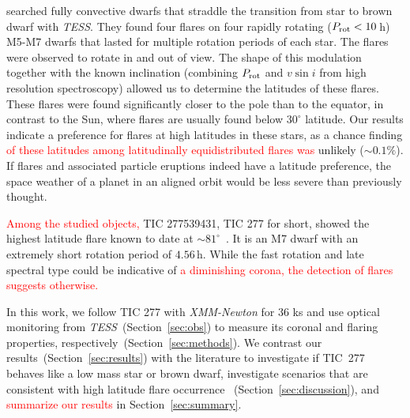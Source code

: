 \documentclass[twocolumn]{aastex631}
\begin{document}
\citet{ilin2021giant} searched fully convective dwarfs that straddle the transition from star to brown dwarf with \textit{TESS}. They found four flares on four rapidly rotating ($P_{\rm rot}<10\,$h) M5-M7 dwarfs that lasted for multiple rotation periods of each star. The flares were observed to rotate in and out of view. The shape of this modulation together with the known inclination (combining $P_{\rm rot}$ and $v \sin i$ from high resolution spectroscopy) allowed us to determine the latitudes of these flares. These flares were found significantly closer to the pole than to the equator, in contrast to the Sun, where flares are usually found below $30^{\circ}$ latitude. Our results indicate a preference for flares at high latitudes in these stars, as a chance finding \textcolor{red}{of these latitudes among latitudinally equidistributed flares was } unlikely ($\sim 0.1\%$). If flares and associated particle eruptions indeed have a latitude preference, the space weather of a planet in an aligned orbit would be less severe than previously thought. %


\textcolor{red}{Among the studied objects, }TIC 277539431, TIC 277 for short, showed the highest latitude flare known to date at $\sim81^{\circ}$~\citep[][Table \ref{tab:starparams}]{ilin2021giant}. It is an M7 dwarf with an extremely short rotation period of $4.56\,$h. While the fast rotation and late spectral type could be indicative of \textcolor{red}{a diminishing corona, the detection of flares suggests otherwise.} %

In this work, we follow TIC 277 with \textit{XMM-Newton} for 36 ks and use optical monitoring from \textit{TESS}~(Section~\ref{sec:obs}) to measure its coronal and flaring properties, respectively~(Section~\ref{sec:methods}). We contrast our results~(Section~\ref{sec:results}) with the literature to investigate if TIC~277 behaves like a low mass star or brown dwarf, investigate scenarios that are consistent with high latitude flare occurrence ~(Section~\ref{sec:discussion}), and \textcolor{red}{summarize our results} in Section~\ref{sec:summary}.
\end{document}
